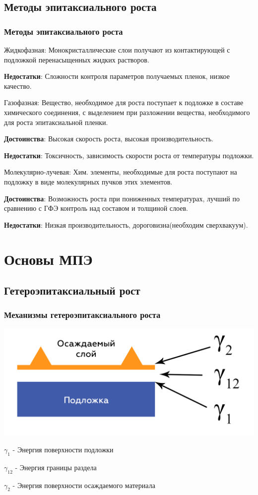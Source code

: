 \documentclass[10pt,pdf,hyperref={unicode}, dvipsnames]{beamer}
\begin{document}
\subsection{Методы эпитаксиального роста}
\begin{frame}[t]
	\frametitle{Методы эпитаксиального роста}

	Жидкофазная: Монокристаллические слои получают из контактирующей с подложкой перенасыщенных жидких растворов.

	\textbf{Недостатки}: Сложности контроля параметров получаемых пленок, низкое качество. 
	\vspace{8pt}

	Газофазная: Вещество, необходимое для роста поступает к подложке в составе химического соединения, с выделением при
	разложении вещества, необходимого для роста эпитаксиальной пленки.

	\textbf{Достоинства}: Высокая скорость роста, высокая производительность.

	\textbf{Недостатки}: Токсичность, зависимость скорости роста от температуры подложки.
	\vspace{8pt}

	Молекулярно-лучевая: Хим. элементы, необходимые для роста поступают на подложку в виде молекулярных пучков этих
	элементов.
	
	\textbf{Достоинства}: Возможность роста при пониженных температурах, лучший по сравнению с ГФЭ контроль над составом и
	толщиной слоев.

	\textbf{Недостатки}: Низкая производительность, дороговизна(необходим сверхвакуум).
\end{frame}

\section{Основы МПЭ}
\subsection{Гетероэпитаксиальный рост}
\begin{frame}[t]
	\frametitle{Механизмы гетероэпитаксиального роста}
	\includegraphics[width = \linewidth]{imgs/struct.png}
	\Large

	$\gamma_1$ - Энергия поверхности подложки
	
	
	$\gamma_{12}$ - Энергия границы раздела
	
	
	$\gamma_2$ - Энергия поверхности осаждаемого материала


\end{frame}
\end{document}
